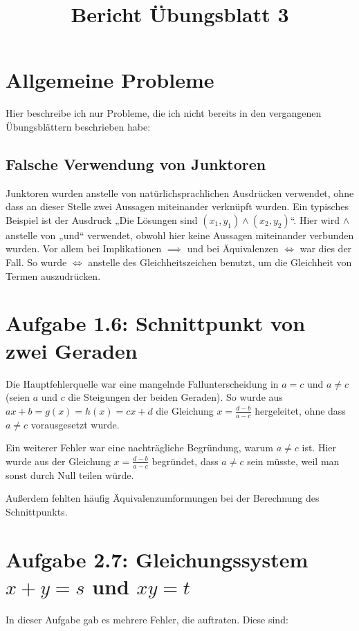 \documentclass[a4paper]{article}
\title{Bericht Übungsblatt 3}
\date{}
\begin{document}
\maketitle

\section{Allgemeine Probleme}

Hier beschreibe ich nur Probleme, die ich nicht bereits in den vergangenen Übungsblättern beschrieben habe:

\subsection{Falsche Verwendung von Junktoren}

Junktoren wurden anstelle von natürlichsprachlichen Ausdrücken verwendet, ohne dass an dieser Stelle zwei Aussagen miteinander verknüpft wurden. Ein typisches Beispiel ist der Ausdruck „Die Lösungen sind $(x_1,y_1) \land (x_2,y_2)$“. Hier wird $\land$ anstelle von „und“ verwendet, obwohl hier keine Aussagen miteinander verbunden wurden. Vor allem bei Implikationen $\implies$ und bei Äquivalenzen $\iff$ war dies der Fall. So wurde $\iff$ anstelle des Gleichheitszeichen benutzt, um die Gleichheit von Termen auszudrücken.

\section{Aufgabe 1.6: Schnittpunkt von zwei Geraden}

Die Hauptfehlerquelle war eine mangelnde Fallunterscheidung in $a=c$ und $a\neq c$ (seien $a$ und $c$ die Steigungen der beiden Geraden). So wurde aus $ax+b=g(x)=h(x)=cx+d$ die Gleichung $x=\frac{d-b}{a-c}$ hergeleitet, ohne dass $a\neq c$ vorausgesetzt wurde.

Ein weiterer Fehler war eine nachträgliche Begründung, warum $a\neq c$ ist. Hier wurde aus der Gleichung $x=\frac{d-b}{a-c}$ begründet, dass $a\neq c$ sein müsste, weil man sonst durch Null teilen würde.

Außerdem fehlten häufig Äquivalenzumformungen bei der Berechnung des Schnittpunkts.

\section{Aufgabe 2.7: Gleichungssystem $x+y=s$ und $xy=t$}

In dieser Aufgabe gab es mehrere Fehler, die auftraten. Diese sind:
\end{document}
